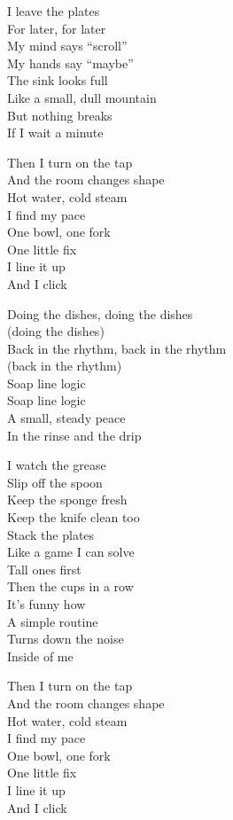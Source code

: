 \begin{lyrics}

I leave the plates\\
For later, for later\\
My mind says “scroll”\\
My hands say “maybe”\\
The sink looks full\\
Like a small, dull mountain\\
But nothing breaks\\
If I wait a minute

Then I turn on the tap\\
And the room changes shape\\
Hot water, cold steam\\
I find my pace\\
One bowl, one fork\\
One little fix\\
I line it up\\
And I click

Doing the dishes, doing the dishes\\
(doing the dishes)\\
Back in the rhythm, back in the rhythm\\
(back in the rhythm)\\
Soap line logic\\
Soap line logic\\
A small, steady peace\\
In the rinse and the drip

I watch the grease\\
Slip off the spoon\\
Keep the sponge fresh\\
Keep the knife clean too\\
Stack the plates\\
Like a game I can solve\\
Tall ones first\\
Then the cups in a row\\
It’s funny how\\
A simple routine\\
Turns down the noise\\
Inside of me

Then I turn on the tap\\
And the room changes shape\\
Hot water, cold steam\\
I find my pace\\
One bowl, one fork\\
One little fix\\
I line it up\\
And I click


\end{lyrics}
